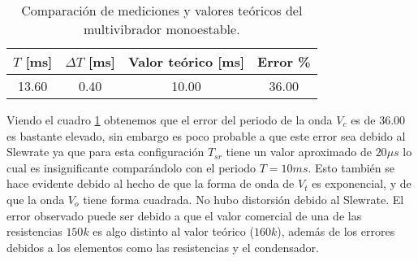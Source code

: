 \begin{table}[ht]
\centering
\begin{tabular}{|c|c|c|c|}
\hline
\(T\) [ms] & \(\Delta T\) [ms] & Valor teórico [ms] & Error \% \\ \hline
13.60 & 0.40 & 10.00 & 36.00 \\ \hline
\end{tabular}
\caption{Comparación de mediciones y valores teóricos del multivibrador monoestable.}
\label{tab:comparacion-multivibrador-monostable}
\end{table}

Viendo el cuadro \ref{tab:comparacion-multivibrador-monostable} obtenemos que el error del periodo de la onda $V_c$ es de $36.00$ es bastante elevado, sin embargo es poco probable a que este error sea debido al Slewrate ya que para esta configuración  $T_{sr}$ tiene un valor aproximado de $20\mu s$ lo cual es insignificante comparándolo con el periodo $T=10ms$. Esto también se hace evidente debido al hecho de que la forma de onda de $V_t$ es exponencial, y de que la onda $V_o$ tiene forma cuadrada. No hubo distorsión debido al Slewrate. El error observado puede ser debido a que el valor comercial de una de las resistencias $150k$ es algo distinto al valor teórico ($160k$), además de los errores debidos a los elementos como las resistencias y el condensador.
